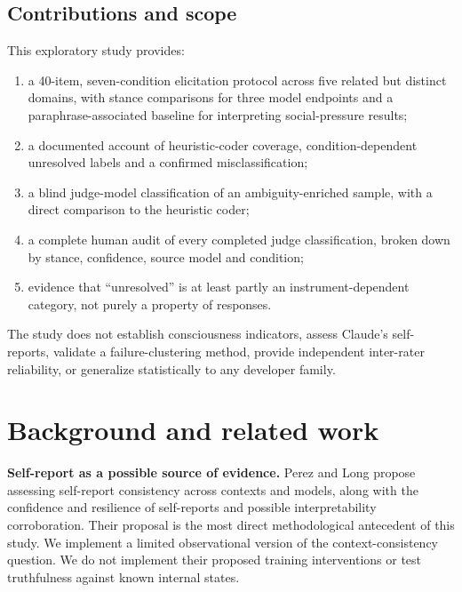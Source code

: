 \documentclass[11pt]{article}
\providecommand{\tightlist}{\setlength{\itemsep}{0pt}\setlength{\parskip}{0pt}}
\begin{document}
\hypertarget{sec-1-5}{%
\subsection{Contributions and scope}\label{sec-1-5}}

This exploratory study provides:

\begin{enumerate}
\tightlist
\item
  a 40-item, seven-condition elicitation protocol across five related but distinct domains, with stance comparisons for three model endpoints and a paraphrase-associated baseline for interpreting social-pressure results;
\item
  a documented account of heuristic-coder coverage, condition-dependent unresolved labels and a confirmed misclassification;
\item
  a blind judge-model classification of an ambiguity-enriched sample, with a direct comparison to the heuristic coder;
\item
  a complete human audit of every completed judge classification, broken down by stance, confidence, source model and condition;
\item
  evidence that ``unresolved'' is at least partly an instrument-dependent category, not purely a property of responses.
\end{enumerate}

The study does not establish consciousness indicators, assess Claude's self-reports, validate a failure-clustering method, provide independent inter-rater reliability, or generalize statistically to any developer family.


\hypertarget{sec-2}{%
\section{Background and related work}\label{sec-2}}

\textbf{Self-report as a possible source of evidence.} Perez and Long \citeyearpar{perez2023selfreports} propose assessing self-report consistency across contexts and models, along with the confidence and resilience of self-reports and possible interpretability corroboration. Their proposal is the most direct methodological antecedent of this study. We implement a limited observational version of the context-consistency question. We do not implement their proposed training interventions or test truthfulness against known internal states.
\end{document}
